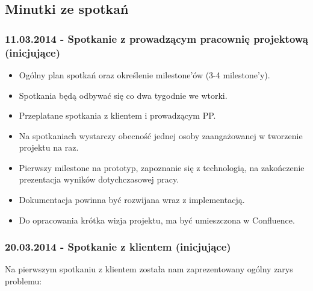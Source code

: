 \documentclass[polish, 12pt]{aghthesis}
\begin{document}
	\subsection{Minutki ze spotkań}
	
		\subsubsection*{11.03.2014 - Spotkanie z prowadzącym pracownię projektową (inicjujące)}
		
			\begin{itemize}
			
				\item Ogólny plan spotkań oraz określenie milestone'ów (3-4 milestone'y).
				\item Spotkania będą odbywać się co dwa tygodnie we wtorki.
				\item Przeplatane spotkania z klientem i prowadzącym PP.
				\item Na spotkaniach wystarczy obecność jednej osoby zaangażowanej w tworzenie projektu na raz.
				\item Pierwszy milestone na prototyp, zapoznanie się z technologią, na zakończenie prezentacja wyników dotychczasowej pracy.
				\item Dokumentacja powinna być rozwijana wraz z implementacją.
				\item Do opracowania krótka wizja projektu, ma być umieszczona w Confluence.
						
			\end{itemize}
		
		\subsubsection*{20.03.2014 - Spotkanie z klientem (inicjujące)}
		
			Na pierwszym spotkaniu z klientem została nam zaprezentowany ogólny zarys problemu:
				
\end{document}
